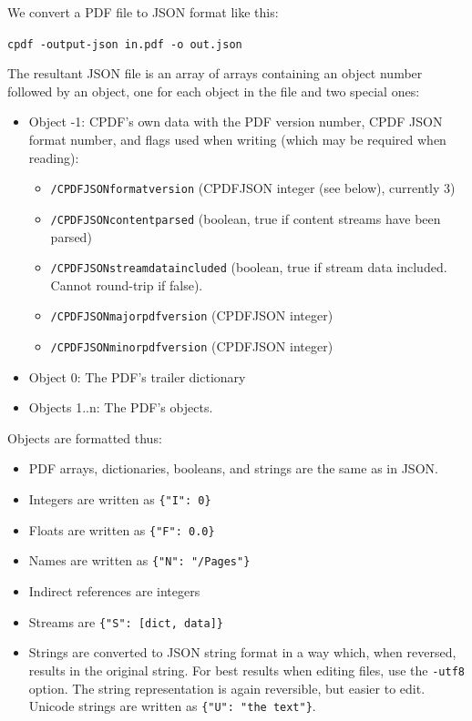 \documentclass{book}
\begin{document}
We convert a PDF file to JSON format like this:

  \begin{framed}
  \small\noindent\verb!cpdf -output-json in.pdf -o out.json!
  \end{framed}

\noindent The resultant JSON file is an array of arrays containing an object number followed by an
object, one for each object in the file and two special ones:

\begin{itemize}
\item Object -1: CPDF's own data with the PDF version number, CPDF JSON format
number, and flags used when writing (which may be required when reading):

\begin{itemize}
  \item \texttt{/CPDFJSONformatversion} (CPDFJSON integer (see below), currently 3)
  \item \texttt{/CPDFJSONcontentparsed} (boolean, true if content streams have been parsed)
  \item \texttt{/CPDFJSONstreamdataincluded} (boolean, true if stream data included. Cannot
  round-trip if false).
  \item \texttt{/CPDFJSONmajorpdfversion} (CPDFJSON integer)
  \item \texttt{/CPDFJSONminorpdfversion} (CPDFJSON integer)
\end{itemize}

\item Object 0: The PDF's trailer dictionary

\item Objects 1..n: The PDF's objects.
\end{itemize}

\noindent Objects are formatted thus:

\begin{itemize}
  \item PDF arrays, dictionaries, booleans, and strings are the same as in JSON.
  \item Integers are written as \texttt{\{"I":\ 0\}}
  \item Floats are written as \texttt{\{"F":\ 0.0\}}
  \item Names are written as \texttt{\{"N":\ "/Pages"\}}
  \item Indirect references are integers
  \item Streams are \texttt{\{"S":\ [dict, data]\}}
  \item Strings are converted to JSON string format in a way which, when reversed, results in the original string. For best results when editing files, use the \texttt{-utf8} option. The string representation is again reversible, but easier to edit. Unicode strings are written as \texttt{\{"U":\ "the text"\}}.
\end{itemize}
\end{document}
